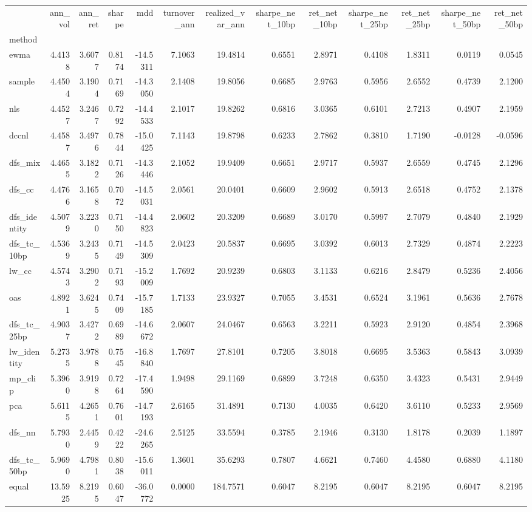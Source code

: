 \begin{tabular}{lrrrrrrrrrrrr}
\toprule
 & ann_vol & ann_ret & sharpe & mdd & turnover_ann & realized_var_ann & sharpe_net_10bp & ret_net_10bp & sharpe_net_25bp & ret_net_25bp & sharpe_net_50bp & ret_net_50bp \\
method &  &  &  &  &  &  &  &  &  &  &  &  \\
\midrule
ewma & 4.4138 & 3.6077 & 0.8174 & -14.5311 & 7.1063 & 19.4814 & 0.6551 & 2.8971 & 0.4108 & 1.8311 & 0.0119 & 0.0545 \\
sample & 4.4504 & 3.1904 & 0.7169 & -14.3050 & 2.1408 & 19.8056 & 0.6685 & 2.9763 & 0.5956 & 2.6552 & 0.4739 & 2.1200 \\
nls & 4.4527 & 3.2467 & 0.7292 & -14.4533 & 2.1017 & 19.8262 & 0.6816 & 3.0365 & 0.6101 & 2.7213 & 0.4907 & 2.1959 \\
dccnl & 4.4587 & 3.4976 & 0.7844 & -15.0425 & 7.1143 & 19.8798 & 0.6233 & 2.7862 & 0.3810 & 1.7190 & -0.0128 & -0.0596 \\
dfs_mix & 4.4655 & 3.1822 & 0.7126 & -14.3446 & 2.1052 & 19.9409 & 0.6651 & 2.9717 & 0.5937 & 2.6559 & 0.4745 & 2.1296 \\
dfs_cc & 4.4766 & 3.1658 & 0.7072 & -14.5031 & 2.0561 & 20.0401 & 0.6609 & 2.9602 & 0.5913 & 2.6518 & 0.4752 & 2.1378 \\
dfs_identity & 4.5079 & 3.2230 & 0.7150 & -14.4823 & 2.0602 & 20.3209 & 0.6689 & 3.0170 & 0.5997 & 2.7079 & 0.4840 & 2.1929 \\
dfs_tc_10bp & 4.5369 & 3.2435 & 0.7149 & -14.5309 & 2.0423 & 20.5837 & 0.6695 & 3.0392 & 0.6013 & 2.7329 & 0.4874 & 2.2223 \\
lw_cc & 4.5743 & 3.2902 & 0.7193 & -15.2009 & 1.7692 & 20.9239 & 0.6803 & 3.1133 & 0.6216 & 2.8479 & 0.5236 & 2.4056 \\
oas & 4.8921 & 3.6245 & 0.7409 & -15.7185 & 1.7133 & 23.9327 & 0.7055 & 3.4531 & 0.6524 & 3.1961 & 0.5636 & 2.7678 \\
dfs_tc_25bp & 4.9037 & 3.4272 & 0.6989 & -14.6672 & 2.0607 & 24.0467 & 0.6563 & 3.2211 & 0.5923 & 2.9120 & 0.4854 & 2.3968 \\
lw_identity & 5.2735 & 3.9788 & 0.7545 & -16.8840 & 1.7697 & 27.8101 & 0.7205 & 3.8018 & 0.6695 & 3.5363 & 0.5843 & 3.0939 \\
mp_clip & 5.3960 & 3.9198 & 0.7264 & -17.4590 & 1.9498 & 29.1169 & 0.6899 & 3.7248 & 0.6350 & 3.4323 & 0.5431 & 2.9449 \\
pca & 5.6115 & 4.2651 & 0.7601 & -14.7193 & 2.6165 & 31.4891 & 0.7130 & 4.0035 & 0.6420 & 3.6110 & 0.5233 & 2.9569 \\
dfs_nn & 5.7930 & 2.4459 & 0.4222 & -24.6265 & 2.5125 & 33.5594 & 0.3785 & 2.1946 & 0.3130 & 1.8178 & 0.2039 & 1.1897 \\
dfs_tc_50bp & 5.9690 & 4.7981 & 0.8038 & -15.6011 & 1.3601 & 35.6293 & 0.7807 & 4.6621 & 0.7460 & 4.4580 & 0.6880 & 4.1180 \\
equal & 13.5925 & 8.2195 & 0.6047 & -36.0772 & 0.0000 & 184.7571 & 0.6047 & 8.2195 & 0.6047 & 8.2195 & 0.6047 & 8.2195 \\
\bottomrule
\end{tabular}
